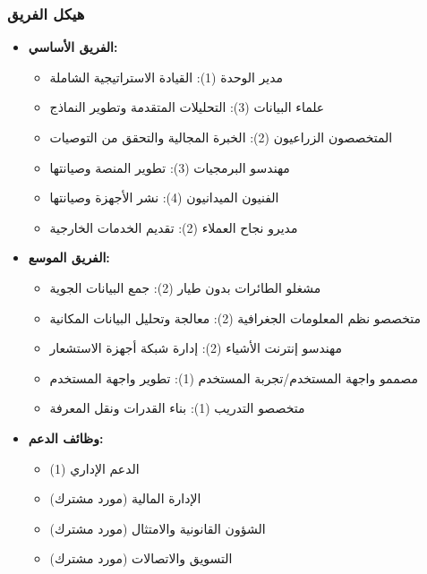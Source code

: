 \subsubsection{هيكل الفريق}
\begin{itemize}
    \item \textbf{الفريق الأساسي:}
    \begin{itemize}
        \item مدير الوحدة (1): القيادة الاستراتيجية الشاملة
        \item علماء البيانات (3): التحليلات المتقدمة وتطوير النماذج
        \item المتخصصون الزراعيون (2): الخبرة المجالية والتحقق من التوصيات
        \item مهندسو البرمجيات (3): تطوير المنصة وصيانتها
        \item الفنيون الميدانيون (4): نشر الأجهزة وصيانتها
        \item مديرو نجاح العملاء (2): تقديم الخدمات الخارجية
    \end{itemize}
    
    \item \textbf{الفريق الموسع:}
    \begin{itemize}
        \item مشغلو الطائرات بدون طيار (2): جمع البيانات الجوية
        \item متخصصو نظم المعلومات الجغرافية (2): معالجة وتحليل البيانات المكانية
        \item مهندسو إنترنت الأشياء (2): إدارة شبكة أجهزة الاستشعار
        \item مصممو واجهة المستخدم/تجربة المستخدم (1): تطوير واجهة المستخدم
        \item متخصصو التدريب (1): بناء القدرات ونقل المعرفة
    \end{itemize}
    
    \item \textbf{وظائف الدعم:}
    \begin{itemize}
        \item الدعم الإداري (1)
        \item الإدارة المالية (مورد مشترك)
        \item الشؤون القانونية والامتثال (مورد مشترك)
        \item التسويق والاتصالات (مورد مشترك)
    \end{itemize}
\end{itemize}

